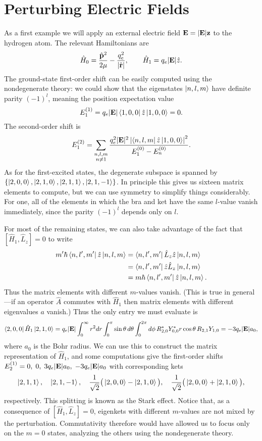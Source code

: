 \documentclass[../p116main.tex]{subfiles}
\begin{document}
\section{Perturbing Electric Fields}
As a first example we will apply an external electric field $\mathbf{E} = |\mathbf{E}| \mathbf{z}$ to the hydrogen atom.
The relevant Hamiltonians are
\[ \hat H_0 = \frac{\hat{\mathbf{p}}^2}{2\mu} - \frac{q_e^2}{|\hat{\mathbf{r}}|}, \qquad \hat H_1 = q_e |\mathbf{E}| \hat z. \]
The ground-state first-order shift can be easily computed using the nondegenerate theory: we could show that the eigenstates $\left| n,l,m \right>$ have definite parity $(-1)^{l}$, meaning the position expectation value
\[ E_1^{(1)} = q_e |\mathbf{E}| \left< 1,0,0 \right| \hat z \left| 1,0,0 \right> = 0. \]
The second-order shift is
\[ E_1^{(2)} = \sum_{\substack{n,l,m \\ n \neq 1}}^{} \frac{q_e^2 |\mathbf{E}|^2 \left| \left< n,l,m \right| \hat z \left| 1,0,0 \right> \right|^2}{E_1^{(0)} - E_n^{(0)}}. \]
As for the first-excited states, the degenerate subspace is spanned by $\left\{ \left| 2,0,0 \right>, \left| 2,1,0 \right>, \left| 2,1,1 \right>, \left| 2,1,-1 \right> \right\}$.
In principle this gives us sixteen matrix elements to compute, but we can use symmetry to simplify things considerably.
For one, all of the elements in which the bra and ket have the same $l$-value vanish immediately, since the parity $(-1)^{l}$ depends only on $l$.

For most of the remaining states, we can also take advantage of the fact that $[\hat H_1, \hat L_z] = 0$ to write 
\begin{align*}
    m' \hbar \left< n, l', m' \right| \hat z \left| n,l,m \right> &= \left< n, l', m' \right| \hat L_z \hat z \left| n,l,m \right> \\
    &= \left< n, l', m' \right| \hat z \hat L_z \left| n,l,m \right> \\
    &= m\hbar \left< n, l', m' \right| \hat z \left| n,l,m \right>.
\end{align*}
Thus the matrix elements with different $m$-values vanish.
(This is true in general---if an operator $\hat A$ commutes with $\hat H_1$ then matrix elements with different eigenvalues $a$ vanish.)
Thus the only entry we must evaluate is
\[ \left< 2,0,0 \right| \hat H_1 \left| 2,1,0 \right> = q_e |\mathbf{E}| \int_{0}^{\infty} r^2 dr \int_{0}^{\pi} \sin \theta \,d\theta \int_{0}^{2\pi} d\phi \, R_{2,0}^* Y_{0,0}^* r \cos \theta \, R_{2,1} Y_{1,0} = -3q_e |\mathbf{E}| a_0, \]
where $a_0$ is the Bohr radius.
We can use this to construct the matrix representation of $\hat H_1$, and some computations give the first-order shifts $E_2^{(1)} = 0, \; 0, \; 3q_e|\mathbf{E}| a_0, \; -3q_e|\mathbf{E}| a_0$ with corresponding kets
\[ \left| 2,1,1 \right>, \quad \left| 2,1,-1 \right>, \quad \frac{1}{\sqrt{2}} \big( \left| 2,0,0 \right> - \left| 2,1,0 \right> \big), \quad \frac{1}{\sqrt{2}} \big( \left| 2,0,0 \right> + \left| 2,1,0 \right> \big), \]
respectively.
This splitting is known as the Stark effect.
Notice that, as a consequence of $[\hat H_1, \hat L_z] = 0$, eigenkets with different $m$-values are not mixed by the perturbation.
Commutativity therefore would have allowed us to focus only on the $m=0$ states, analyzing the others using the nondegenerate theory.
\end{document}

